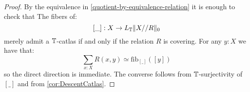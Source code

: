 \begin{proof}
	By the equivalence in \ref{quotient-by-equivalence-relation} it is enough to check that
		The fibers of: 
		\[[\_]:X\to L_{\mathbb{T}} \| X//R \|_0\] 
		merely admit a $\mathbb{T}$-catlas if and only if the relation $R$ is covering. For any $y:X$ we have that:
		\[\sum_{x:X} R(x,y) \simeq \mathrm{fib}_{[\_]}([y])\]
		so the direct direction is immediate. The converse follows from $\mathbb{T}$-surjectivity of $[\_]$ and from \ref{cor:DescentCatlas}.
\end{proof}
